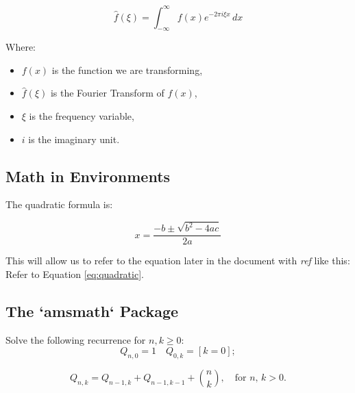 \documentclass{article}
\newcommand{\cmd}[1]{\textit{#1}}
\begin{document}
\[
\hat{f}(\xi) = \int_{-\infty}^\infty f(x) e^{-2\pi i \xi x} \, dx
\]

Where:
\begin{itemize}
  \item \( f(x) \) is the function we are transforming,
  \item \( \hat{f}(\xi) \) is the Fourier Transform of \( f(x) \),
  \item \( \xi \) is the frequency variable,
  \item \( i \) is the imaginary unit.
\end{itemize}

\subsection{Math in Environments}

The quadratic formula is:

\begin{equation}
x = \frac{-b \pm \sqrt{b^2 - 4ac}}{2a}
\label{eq:quadratic}
\end{equation}

This will allow us to refer to the equation later in the document with \cmd{ref} like this:
Refer to Equation \ref{eq:quadratic}.

\subsection{The `amsmath` Package}

Solve the following recurrence for $ n,k\geq 0 $:
\[
Q_{n,0} = 1   \quad Q_{0,k} = [k=0];
\]

\[
Q_{n,k} = Q_{n-1,k}+Q_{n-1,k-1}+\binom{n}{k}, \quad\text{for $n$, $k>0$.}
\]
\end{document}
